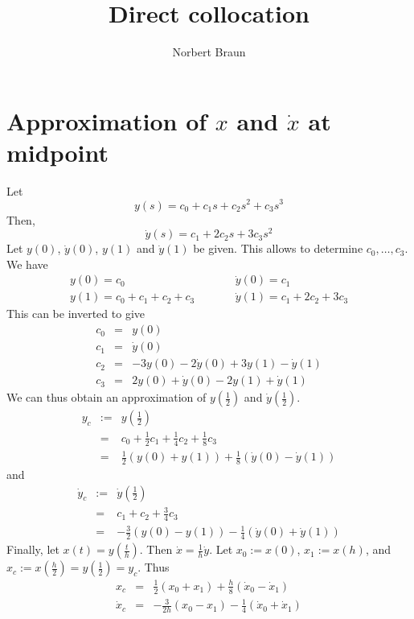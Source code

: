 \documentclass[a4paper]{article}
\title{Direct collocation}
\author{Norbert Braun}
\begin{document}
\maketitle
\section{Approximation of $x$ and $\dot{x}$ at midpoint}
Let
\begin{equation}
y(s) = c_0 + c_1 s + c_2 s^2 + c_3 s^3
\end{equation}
Then,
\begin{equation}
\dot{y}(s) = c_1 + 2 c_2 s + 3 c_3 s^2
\end{equation}
Let $y(0)$, $\dot{y}(0)$, $y(1)$ and $\dot{y}(1)$ be given. This allows to determine $c_0,\ldots,c_3$.
We have
\begin{eqnarray}
y(0) = c_0 &\qquad& \dot{y}(0) = c_1\\
y(1) = c_0 + c_1 + c_2 + c_3 &\qquad& \dot{y}(1) = c_1 + 2c_2 + 3c_3 \nonumber
\end{eqnarray}
This can be inverted to give
\begin{eqnarray}
c_0 &=& y(0)\\
c_1 &=& \dot{y}(0)\nonumber \\
c_2 &=& -3y(0) - 2\dot{y}(0) + 3y(1) - \dot{y}(1)\nonumber \\
c_3 &=& 2y(0) + \dot{y}(0) - 2y(1) + \dot{y}(1)\nonumber
\end{eqnarray}
We can thus obtain an approximation of $y(\frac{1}{2})$ and $\dot{y}(\frac{1}{2})$.
\begin{eqnarray}
y_c &:=& y(\frac{1}{2})\\
&=& c_0 + \frac{1}{2} c_1 + \frac{1}{4} c_2 + \frac{1}{8} c_3\nonumber \\
&=& \frac{1}{2} \left( y(0) + y(1) \right) + \frac{1}{8} \left( \dot{y}(0) - \dot{y}(1) \right)\nonumber
\end{eqnarray}
and
\begin{eqnarray}
\dot{y}_c &:=& \dot{y}(\frac{1}{2})\\
&=& c_1 + c_2 + \frac{3}{4} c_3\nonumber \\
&=& -\frac{3}{2} \left( y(0) - y(1) \right) - \frac{1}{4} \left( \dot{y}(0) + \dot{y}(1) \right) \nonumber
\end{eqnarray}
Finally, let $x(t) = y(\frac{t}{h})$. Then $\dot{x} = \frac{1}{h} \dot{y}$. Let $x_0 := x(0)$, $x_1 := x(h)$, and $x_c := x(\frac{h}{2}) = y(\frac{1}{2}) = y_c$. Thus
\begin{eqnarray}
x_c &=& \frac{1}{2}\left( x_0 + x_1 \right) + \frac{h}{8} \left( \dot{x}_0 - \dot{x}_1 \right)\\
\dot{x}_c &=& - \frac{3}{2h} \left( x_0 - x_1 \right) - \frac{1}{4} \left( \dot{x}_0 + \dot{x}_1 \right)
\end{eqnarray}
\end{document}

